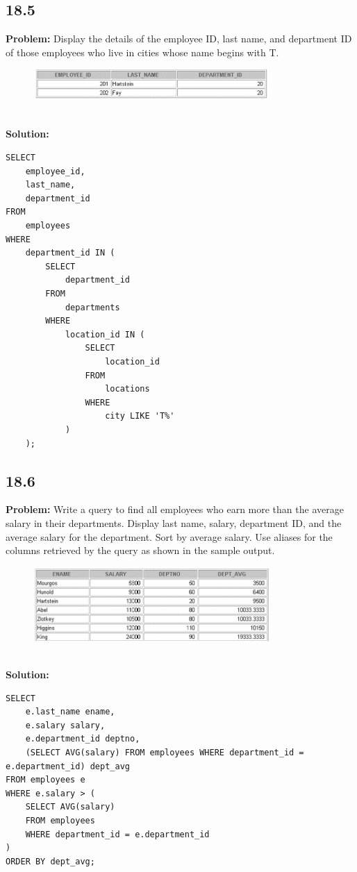 \documentclass[12pt,a4paper]{article}
\begin{document}
\begin{itemize}
\subsection*{18.5}
\textbf{Problem:} Display the details of the employee ID, last name, and department ID of those employees who live in cities whose name begins with T.
\\
\begin{figure}[htbp]
  \centering
  \includegraphics[width=0.8\textwidth]{Screenshots/185.png}
\end{figure}\\
\newpage
\textbf{Solution:}
\begin{lstlisting}
SELECT 
    employee_id,
    last_name,
    department_id
FROM
    employees
WHERE
    department_id IN (
        SELECT
            department_id
        FROM
            departments
        WHERE
            location_id IN (
                SELECT
                    location_id
                FROM
                    locations
                WHERE
                    city LIKE 'T%'
            )
    );
\end{lstlisting}

\subsection*{18.6}
\textbf{Problem:} Write a query to find all employees who earn more than the average salary in their departments. Display last name, salary, department ID, and the average salary for the department. Sort by average salary. Use aliases for the columns retrieved by the query as shown in the sample output.
\\
\begin{figure}[htbp]
  \centering
  \includegraphics[width=0.8\textwidth]{Screenshots/186.png}
\end{figure}\\
\textbf{Solution:}
\begin{lstlisting}
SELECT 
    e.last_name ename,
    e.salary salary,
    e.department_id deptno,
    (SELECT AVG(salary) FROM employees WHERE department_id = e.department_id) dept_avg
FROM employees e
WHERE e.salary > (
    SELECT AVG(salary)
    FROM employees
    WHERE department_id = e.department_id
)
ORDER BY dept_avg;
\end{lstlisting}


\end{itemize}
\end{document}
